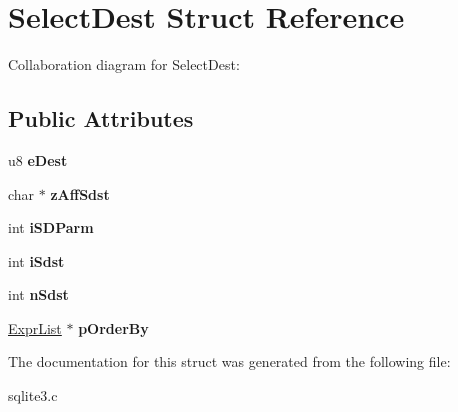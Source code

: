 \hypertarget{structSelectDest}{}\section{Select\+Dest Struct Reference}
\label{structSelectDest}


Collaboration diagram for Select\+Dest\+:
\subsection*{Public Attributes}
\begin{DoxyCompactItemize}
\item 
u8 {\bfseries e\+Dest}\hypertarget{structSelectDest_a779c1809acadd15898db0b20e31cc23f}{}\label{structSelectDest_a779c1809acadd15898db0b20e31cc23f}

\item 
char $\ast$ {\bfseries z\+Aff\+Sdst}\hypertarget{structSelectDest_ada0376591a63aacaf9f39f9b45bb7178}{}\label{structSelectDest_ada0376591a63aacaf9f39f9b45bb7178}

\item 
int {\bfseries i\+S\+D\+Parm}\hypertarget{structSelectDest_ad30d63b2b7216a533a5ea476412664aa}{}\label{structSelectDest_ad30d63b2b7216a533a5ea476412664aa}

\item 
int {\bfseries i\+Sdst}\hypertarget{structSelectDest_adbc1c5f38b8c95da1d05e8c25dee400f}{}\label{structSelectDest_adbc1c5f38b8c95da1d05e8c25dee400f}

\item 
int {\bfseries n\+Sdst}\hypertarget{structSelectDest_aa4e7438446ef26231f7426edfda13e19}{}\label{structSelectDest_aa4e7438446ef26231f7426edfda13e19}

\item 
\hyperlink{structExprList}{Expr\+List} $\ast$ {\bfseries p\+Order\+By}\hypertarget{structSelectDest_a10881e4ffff470814a592d6d7e1541fa}{}\label{structSelectDest_a10881e4ffff470814a592d6d7e1541fa}

\end{DoxyCompactItemize}


The documentation for this struct was generated from the following file\+:\begin{DoxyCompactItemize}
\item 
sqlite3.\+c\end{DoxyCompactItemize}
